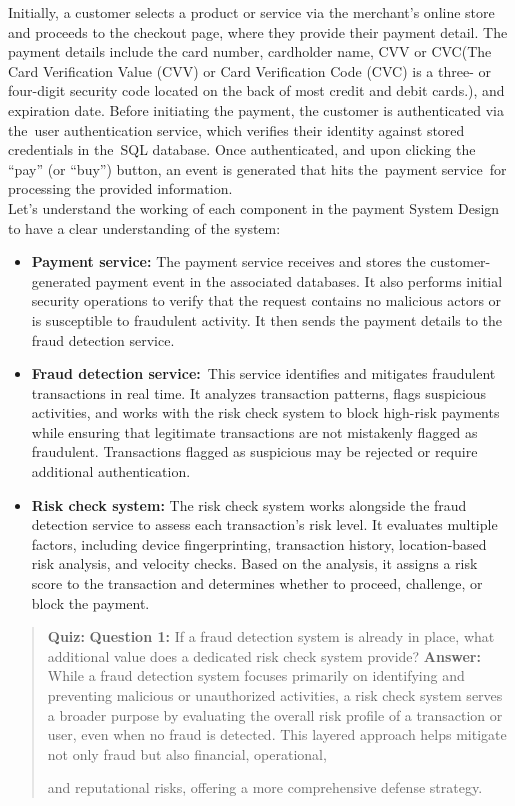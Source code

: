 Initially, a customer selects a product or service via the merchant's online store and proceeds to the checkout page, where they provide their payment detail. The payment details include the card number, cardholder name, CVV or CVC(The Card Verification Value (CVV) or Card Verification Code (CVC) is a three- or four-digit security code located on the back of most credit and debit cards.), and expiration date. Before initiating the payment, the customer is authenticated via the~user authentication service, which verifies their identity against stored credentials in the~SQL database. Once authenticated, and upon clicking the ``pay'' (or ``buy'') button, an event is generated that hits the~payment service~for processing the provided information.
\\
Let's understand the working of each component in the payment System Design to have a clear understanding of the system:

\begin{itemize}
\item
\protect{}\label{p2jCH1YPRpg0Op-dvmxdS}
\textbf{Payment service:} The payment service receives and stores the customer-generated payment event in the associated databases. It also performs initial security operations to verify that the request contains no malicious actors or is susceptible to fraudulent activity. It then sends the payment details to the fraud detection service.
\item
\protect{}\label{pA8PR31tmunNqAM4l95Ei}
\textbf{Fraud detection service:}~This service identifies and mitigates fraudulent transactions in real time. It analyzes transaction patterns, flags suspicious activities, and works with the risk check system to block high-risk payments while ensuring that legitimate transactions are not mistakenly flagged as fraudulent. Transactions flagged as suspicious may be rejected or require additional authentication.
\item
\protect{}\label{bnqhxmrmXLvjEvU1fqLPP}
\textbf{Risk check system:} The risk check system works alongside the fraud detection service to assess each transaction's risk level. It evaluates multiple factors, including device fingerprinting, transaction history, location-based risk analysis, and velocity checks. Based on the analysis, it assigns a risk score to the transaction and determines whether to proceed, challenge, or block the payment.
\end{itemize}

\begin{quote}
\textbf{Quiz:}
\textbf{Question 1:} If a fraud detection system is already in place, what additional value does a dedicated risk check system provide?
\textbf{Answer:} While a fraud detection system focuses primarily on identifying and preventing malicious or unauthorized activities, a risk check system serves a broader purpose by evaluating the overall risk profile of a transaction or user, even when no fraud is detected. This layered approach helps mitigate not only fraud but also financial, operational,

and reputational risks, offering a more comprehensive defense strategy.
\end{quote}

